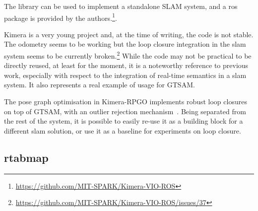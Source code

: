 \documentclass[11pt, letterpaper, twoside]{article}
\begin{document}
The library can be used to implement a standalone SLAM system, and a \gls{ros}
package is provided by the
authors.\footnote{\url{https://github.com/MIT-SPARK/Kimera-VIO-ROS}}.

Kimera is a very young project and, at the time of writing, the code is not
stable. The odometry seems to be working but the loop closure integration in
the \gls{slam} system seems to be currently
broken.\footnote{\url{https://github.com/MIT-SPARK/Kimera-VIO-ROS/issues/37}}
While the code may not be practical to be directly reused, at least for the
moment, it is a noteworthy reference to previous work, especially with respect
to the integration of real-time semantics in a \gls{slam} system. It also
represents a real example of usage for GTSAM.

The pose graph optimisation in Kimera-RPGO implements robust loop closures on
top of GTSAM, with an outlier rejection mechanism~\cite{mangelson2018pairwise}.
Being separated from the rest of the system, it is possible to easily re-use it
as a building block for a different \gls{slam} solution, or use it as a
baseline for experiments on loop closure.

\subsection{\acs{rtabmap}}
\end{document}
